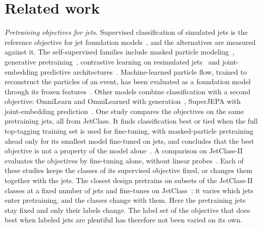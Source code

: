\section{Related work}\label{sec:related}

\emph{Pretraining objectives for jets.} Supervised classification of simulated jets is the reference
objective for jet foundation models~\cite{part,sophon}, and the alternatives are measured against it.
The self-supervised families include masked particle modeling~\cite{mpm,mpmtok}, generative
pretraining~\cite{omnijet}, contrastive learning on resimulated jets~\cite{rs3l} and joint-embedding
predictive architectures~\cite{hepjepa,jpjepa}. Machine-learned particle flow, trained to reconstruct the
particles of an event, has been evaluated as a foundation model through its frozen features~\cite{mlpf_fm}. Other models combine classification with a second
objective: OmniLearn and OmniLearned with generation~\cite{omnilearn,omnilearned}, SuperJEPA with
joint-embedding prediction~\cite{superjepa}. One study compares the objectives on the same
pretraining jets, all from JetClass. It finds classification best or tied when the full top-tagging
training set is used for fine-tuning, with masked-particle pretraining ahead only for its smallest
model fine-tuned on \LitObjectivesFewJets{} jets, and concludes that the best objective is not a
property of the model alone~\cite[Sec.~IV.A]{objectives}. A comparison on JetClass-II evaluates the
objectives by fine-tuning alone, without linear probes~\cite{reprlearn}. Each of these studies keeps
the classes of its supervised objective fixed, or changes them together with the jets. The closest
design pretrains on subsets of the JetClass-II classes at a fixed number of jets and fine-tunes on
JetClass~\cite{datacomp}; it varies which jets enter pretraining, and the classes change with them.
Here the pretraining jets stay fixed and only their labels change. The label set
of the objective that does best when labeled jets are plentiful has therefore not been varied on its
own.

